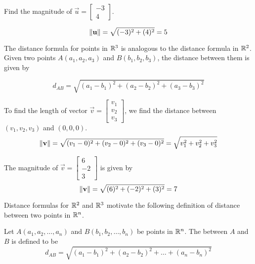 \documentclass{ximera}
\begin{document}
\begin{example}\label{ex:findmaginr2} Find the magnitude of $\vec{u}=\begin{bmatrix}-3\\4\end{bmatrix}$.  
\begin{center}
\end{center}
\begin{explanation}

 $$
\left\lVert\mathbf{u}\right\rVert=\sqrt{(-3)^2+(4)^2}=5
$$
\end{explanation}
\end{example}


The distance formula for points in $\mathbb{R}^3$ is analogous to the distance formula in $\mathbb{R}^2$.  Given two points $A(a_1, a_2, a_3)$ and $B(b_1, b_2, b_3)$, the distance between them is given by 

\begin{equation*}
d_{AB}=\sqrt{(a_1-b_1)^2+(a_2-b_2)^2+(a_3-b_3)^2}
\end{equation*}

To find the length of vector $\vec{v}=\begin{bmatrix}v_1\\ v_2\\ v_3\end{bmatrix}$, we find the distance between $(v_1, v_2, v_3)$ and $(0, 0, 0)$.
\begin{equation}\label{eq:normr3}
\left\lVert\mathbf{v}\right\rVert=\sqrt{(v_1-0)^2+(v_2-0)^2+(v_3-0)^2}=\sqrt{v_1^2+v_2^2+v_3^2}
\end{equation}

\begin{example}\label{ex:findmaginr3}
The magnitude of $\vec{v}=\begin{bmatrix}6\\-2\\3\end{bmatrix}$ is given by
$$
\left\lVert\mathbf{v}\right\rVert=\sqrt{(6)^2+(-2)^2+(3)^2}=7
$$
\end{example}


Distance formulas for $\mathbb{R}^2$ and $\mathbb{R}^3$ motivate the following definition of distance between two points in $\mathbb{R}^n$.

  \begin{definition}\label{def:distrn} Let $A(a_1, a_2,\ldots, a_n)$ and $B(b_1, b_2,\ldots, b_n)$ be points in $\mathbb{R}^n$.  The  between $A$ and $B$ is defined to be
\begin{equation*}
d_{AB}=\sqrt{(a_1-b_1)^2+(a_2-b_2)^2+\ldots +(a_n-b_n)^2}
\end{equation*}
\end{definition}
\end{document}
